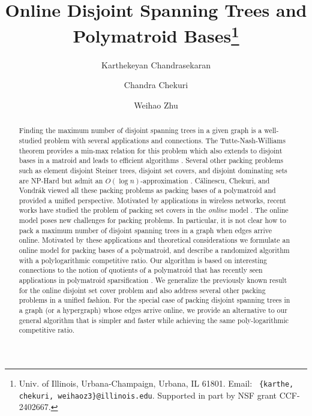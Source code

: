 \documentclass[11pt]{article}
\title{Online Disjoint Spanning Trees and Polymatroid Bases\thanks{Univ. of Illinois, Urbana-Champaign, Urbana, IL 61801. Email: {\tt
      \{karthe, chekuri, weihaoz3\}@illinois.edu}. Supported in part by NSF grant CCF-2402667.}}
\author{Karthekeyan Chandrasekaran
\and Chandra Chekuri
\and Weihao Zhu 
}
\theoremstyle{definition}
\begin{document}
\maketitle

\begin{abstract}
Finding the maximum number of disjoint spanning trees in a given graph is a well-studied problem with several applications and connections. The Tutte-Nash-Williams theorem provides a min-max relation for this problem which also extends to disjoint bases in a matroid and leads to efficient algorithms \cite{Schrijver-book}. Several other packing problems such as element disjoint Steiner trees, disjoint set covers,  and disjoint dominating sets are NP-Hard but admit an $O(\log{n})$-approximation \cite{FHKS02,CS07}. C{\u{a}}linescu, Chekuri, and Vondr\'{a}k \cite{CCV09} viewed all these packing problems as packing bases of a polymatroid and provided a unified perspective. Motivated by applications in wireless networks, recent works have studied the problem of packing set covers in the \emph{online} model \cite{PBV15, EGK19, BBJ24}. 
The online model poses new challenges for packing problems. In particular, it is not clear how to pack a maximum number of disjoint spanning trees in a graph when edges arrive online.  Motivated by these applications and theoretical considerations we formulate an online model for packing bases of a polymatroid, and describe a randomized algorithm with a polylogarithmic competitive ratio. Our algorithm is based on interesting connections to the notion of quotients of a polymatroid that has recently seen applications in polymatroid sparsification \cite{quanrud2024quotient}. We generalize the previously known result for the online disjoint set cover problem \cite{EGK19} and also address several other packing problems in a unified fashion. 
For the special case of packing disjoint spanning trees in a graph (or a hypergraph) whose edges arrive online, we provide an alternative to our general algorithm that is simpler and faster while achieving the same poly-logarithmic competitive ratio. 
\end{abstract} 
\newpage
{}
\end{document}
